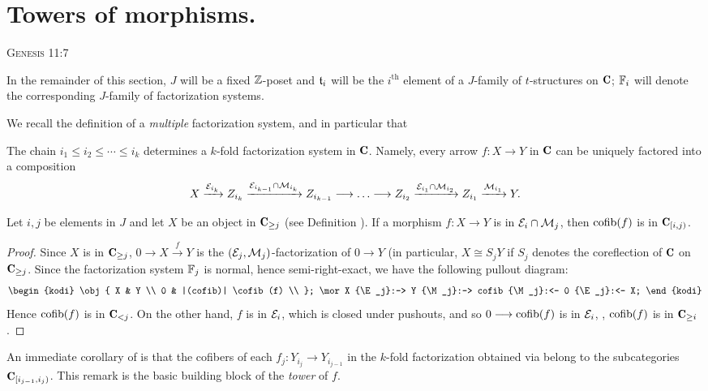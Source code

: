 \section{Towers of morphisms.}
\epigraph{ }{\textsc{Genesis} 11:7}
In the remainder of this section, $J$ will be a fixed $\mathbb{Z}$-poset and $\mathfrak{t}_i$ will be the $i^\text{th}$ element of a $J$-family of $t$-structures on $\C$; $\mathbb{F}_i$ will denote the corresponding $J$-family of factorization systems.

We recall the definition of a \emph{multiple} factorization system, and in particular that
\begin{lemma}\label{k.fold.fact}
The chain $i_1\leq i_2\leq\cdots\leq i_k$ determines a $k$-fold factorization system in $\C$. Namely, every arrow $f\colon X\to Y$ in $\C$ can be uniquely factored into a composition
\[
X \xto{\E_{i_k}} Z_{i_k} \xto{\E_{i_{k-1}}\cap \M_{i_k}} Z_{i_{k-1}}\to\dots\to Z_{i_{2}} \xto{\E_{i_{1}}\cap \M_{i_{2}}} Z_{i_1} \xto{\M_{i_{1}}} Y.
\]
\end{lemma}
\begin{lemma}\label{versa.vice}
Let $i,j$ be elements in $J$ and let $X$ be an object in $\C_{\geq j}$ (see Definition ). If a morphism $f\colon X\to Y$ is in $\mathcal{E}_{i}\cap \mathcal{M}_{j}$, then $\operatorname{cofib}(f)$ is in $\C_{[i,j)}$.\end{lemma}
\begin{proof}
Since $X$ is in $\C_{\geq j}$, $0\to X\xrightarrow{f} Y$ is the $(\mathcal{E}_j,\mathcal{M}_j)$-factorization of $0\to Y$ (in particular, $X\cong S_jY$ if $S_j$ denotes the coreflection of $\C$ on $\C_{\ge j}$. Since the factorization system $\mathbb{F}_j$ is normal, hence semi-right-exact, we have the following pullout diagram:
\[
\begin{kodi}
\obj{
	X & Y \\
	0 & |(cofib)| \cofib(f) \\
};
\mor X {\E_j}:-> Y {\M_j}:-> cofib {\M_j}:<- 0 {\E_j}:<- X;
\end{kodi}
\]
Hence $\operatorname{cofib}(f)$ is in $\C_{<j}$. On the other hand, $f$ is in $\mathcal{E}_i$, which is closed under pushouts, and so $0\longrightarrow \operatorname{cofib}(f)$ is in $\mathcal{E}_i$, \ie, $\operatorname{cofib}(f)$ is in $\C_{\geq i}$.
\end{proof}
An immediate corollary of  is that the cofibers of each $f_j\colon Y_{i_j}\to Y_{i_{j-1}}$ in the $k$-fold factorization obtained via  belong to the subcategories $\C_{[i_{j-1},i_j)}$. This remark is the basic building block of the \emph{tower} of $f$.
